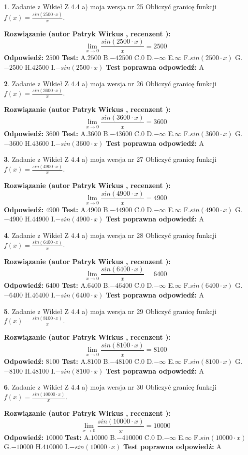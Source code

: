 \documentclass[12pt, a4paper]{article}
\theoremstyle{definition} %
\newtheorem{zad}{}
\newcommand{\zadStart}[1]{\begin{zad}#1\newline}
\newcommand{\zadStop}{\end{zad}}
\newcommand{\rozwStart}[2]{\noindent \textbf{Rozwiązanie (autor #1 , recenzent #2): }\newline}
\newcommand{\rozwStop}{\newline}
\newcommand{\odpStart}{\noindent \textbf{Odpowiedź:}\newline}
\newcommand{\odpStop}{\newline}
\newcommand{\testStart}{\noindent \textbf{Test:}\newline}
\newcommand{\testStop}{\newline}
\newcommand{\kluczStart}{\noindent \textbf{Test poprawna odpowiedź:}\newline}
\newcommand{\kluczStop}{\newline}
\begin{document}
\zadStart{Zadanie z Wikieł Z 4.4 a) moja wersja nr 25}
Obliczyć granicę funkcji $f(x)=\frac{sin(2500\cdot x)}{x}$.
\zadStop
\rozwStart{Patryk Wirkus}{}
$$\lim\limits_{x\to 0}\frac{sin(2500\cdot x)}{x}=
2500$$
\rozwStop
\odpStart
$2500$
\odpStop
\testStart
A.$2500$
B.$-42500$
C.$0$
D.$-\infty$
E.$\infty$
F.$sin(2500\cdot x)$
G.$-2500$
H.$42500$
I.$-sin(2500\cdot x)$
\testStop
\kluczStart
A
\kluczStop



\zadStart{Zadanie z Wikieł Z 4.4 a) moja wersja nr 26}
Obliczyć granicę funkcji $f(x)=\frac{sin(3600\cdot x)}{x}$.
\zadStop
\rozwStart{Patryk Wirkus}{}
$$\lim\limits_{x\to 0}\frac{sin(3600\cdot x)}{x}=
3600$$
\rozwStop
\odpStart
$3600$
\odpStop
\testStart
A.$3600$
B.$-43600$
C.$0$
D.$-\infty$
E.$\infty$
F.$sin(3600\cdot x)$
G.$-3600$
H.$43600$
I.$-sin(3600\cdot x)$
\testStop
\kluczStart
A
\kluczStop



\zadStart{Zadanie z Wikieł Z 4.4 a) moja wersja nr 27}
Obliczyć granicę funkcji $f(x)=\frac{sin(4900\cdot x)}{x}$.
\zadStop
\rozwStart{Patryk Wirkus}{}
$$\lim\limits_{x\to 0}\frac{sin(4900\cdot x)}{x}=
4900$$
\rozwStop
\odpStart
$4900$
\odpStop
\testStart
A.$4900$
B.$-44900$
C.$0$
D.$-\infty$
E.$\infty$
F.$sin(4900\cdot x)$
G.$-4900$
H.$44900$
I.$-sin(4900\cdot x)$
\testStop
\kluczStart
A
\kluczStop



\zadStart{Zadanie z Wikieł Z 4.4 a) moja wersja nr 28}
Obliczyć granicę funkcji $f(x)=\frac{sin(6400\cdot x)}{x}$.
\zadStop
\rozwStart{Patryk Wirkus}{}
$$\lim\limits_{x\to 0}\frac{sin(6400\cdot x)}{x}=
6400$$
\rozwStop
\odpStart
$6400$
\odpStop
\testStart
A.$6400$
B.$-46400$
C.$0$
D.$-\infty$
E.$\infty$
F.$sin(6400\cdot x)$
G.$-6400$
H.$46400$
I.$-sin(6400\cdot x)$
\testStop
\kluczStart
A
\kluczStop



\zadStart{Zadanie z Wikieł Z 4.4 a) moja wersja nr 29}
Obliczyć granicę funkcji $f(x)=\frac{sin(8100\cdot x)}{x}$.
\zadStop
\rozwStart{Patryk Wirkus}{}
$$\lim\limits_{x\to 0}\frac{sin(8100\cdot x)}{x}=
8100$$
\rozwStop
\odpStart
$8100$
\odpStop
\testStart
A.$8100$
B.$-48100$
C.$0$
D.$-\infty$
E.$\infty$
F.$sin(8100\cdot x)$
G.$-8100$
H.$48100$
I.$-sin(8100\cdot x)$
\testStop
\kluczStart
A
\kluczStop



\zadStart{Zadanie z Wikieł Z 4.4 a) moja wersja nr 30}
Obliczyć granicę funkcji $f(x)=\frac{sin(10000\cdot x)}{x}$.
\zadStop
\rozwStart{Patryk Wirkus}{}
$$\lim\limits_{x\to 0}\frac{sin(10000\cdot x)}{x}=
10000$$
\rozwStop
\odpStart
$10000$
\odpStop
\testStart
A.$10000$
B.$-410000$
C.$0$
D.$-\infty$
E.$\infty$
F.$sin(10000\cdot x)$
G.$-10000$
H.$410000$
I.$-sin(10000\cdot x)$
\testStop
\kluczStart
A
\kluczStop
\end{document}
